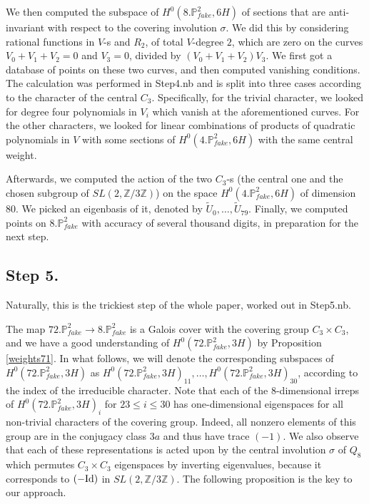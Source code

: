 \documentclass[11pt,reqno]{amsart}
\def\Z {{\mathbb Z}}
\def\P {{\mathbb P}}
\def\FPP {{\P^2_{fake}}}
\theoremstyle{definition}
\numberwithin{equation}{section}
\begin{document}
\medskip
We then computed the subspace of $H^0(8.\FPP,6H)$ of sections that are anti-invariant with respect to the covering involution $\sigma$.
We did this by considering rational functions in $V$-s and $R_2$, of total $V$-degree $2$, which are zero on the curves $V_0+V_1+V_2=0$ and $V_3=0$, divided by $(V_0+V_1+V_2)V_3$. We first got a database of points on these two curves, and then computed vanishing conditions. The calculation was performed in Step4.nb and is split into three cases according to the character of the central $C_3$. Specifically, for the trivial character, we looked for degree four polynomials in $V_i$ which vanish at the aforementioned curves. For the other characters, we looked for linear combinations of products of quadratic polynomials in $V$ with some sections of $H^0(4.\FPP,6H)$ with the same  central weight.

\medskip
Afterwards, we computed the action of the two $C_3$-s (the central one and the chosen subgroup of $SL(2,\Z/3\Z)$) on the space $H^0(4.\FPP,6H)$ of dimension $80$. We picked an eigenbasis of it, denoted by $\tilde U_0, \ldots, \tilde U_{79}$. Finally, we computed points on $8.\FPP$ with accuracy of several thousand digits, in preparation for the next step.

\subsection{Step 5.} Naturally, this is the trickiest step of the whole paper, worked out in Step5.nb.

\medskip
The map $72.\FPP\to 8.\FPP$ is a Galois cover with the covering group $C_3\times C_3$, and we have a good understanding of $H^0(72.\FPP,3H)$ by 
Proposition \ref{weights71}.  In what follows, we will denote the corresponding subspaces of $H^0(72.\FPP,3H)$ as $H^0(72.\FPP,3H)_{11},\ldots, H^0(72.\FPP,3H)_{30}$, according to the index of the irreducible character.
Note that each of the $8$-dimensional irreps of $H^0(72.\FPP,3H)_{i}$ for $23\leq i\leq 30$ has one-dimensional eigenspaces for all non-trivial characters of the covering group. Indeed, all nonzero elements of this group are in the conjugacy class $3a$ and thus have trace $(-1)$. We also observe that each of these representations is acted upon by the central involution $\sigma$ of $Q_8$ which permutes $C_3\times C_3$ eigenspaces by inverting eigenvalues, because it corresponds to $(-{\rm Id})$ in $SL(2,\Z/3\Z)$.
The following proposition is the key to our approach. 
\end{document}
